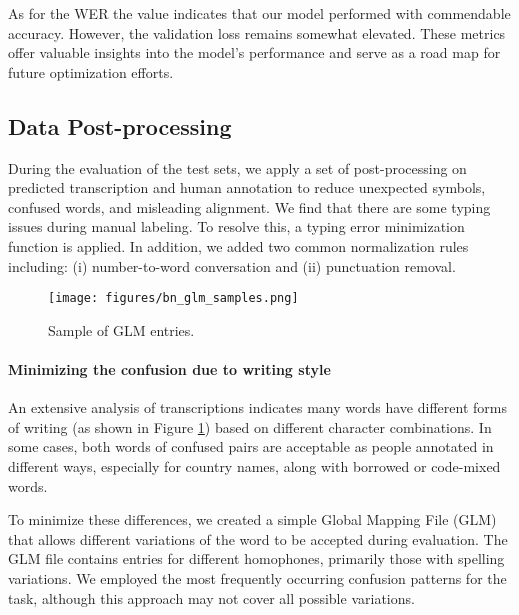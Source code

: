 As for the WER the value indicates that our model performed with commendable accuracy. However, the validation loss remains somewhat elevated. These metrics offer valuable insights into the model's performance and serve as a road map for future optimization efforts.


\subsection{Data Post-processing}
During the evaluation of the test sets, we apply a set of post-processing on predicted transcription and human annotation to reduce unexpected symbols, confused words, and misleading alignment. We find that there are some typing issues during manual labeling.
To resolve this, a typing error minimization function is applied. In addition, we added two common normalization rules including: (i) number-to-word conversation and (ii) punctuation removal. 


\begin{figure} [!ht]
\centering
\texttt{[image: figures/bn\_glm\_samples.png]}
\caption{Sample of GLM entries.}
\label{fig:glm}
\end{figure}

\paragraph{Minimizing the confusion due to writing style}
An extensive analysis of transcriptions indicates many words have different forms of writing (as shown in Figure \ref{fig:glm}) based on different character combinations. 
In some cases, both words of confused pairs are acceptable as people annotated in different ways, especially for country names, along with borrowed or code-mixed words.

To minimize these differences, we created a simple Global Mapping File (GLM) that allows different variations of the word to be accepted during evaluation. The GLM file contains entries for different homophones, primarily those with spelling variations.
We employed the most frequently occurring confusion patterns for the task, although this approach may not cover all possible variations.

